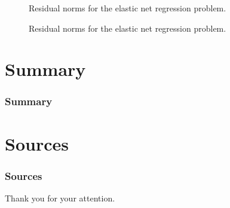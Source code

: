 \begin{frame}
	\begin{figure}
		\centering
		
		\caption{Residual norms for the elastic net regression problem.}
	\end{figure}
\end{frame}

\begin{frame}
	\begin{figure}
		\centering
		{\scriptsize
		
		}
		\caption{Residual norms for the elastic net regression problem.}
	\end{figure}
\end{frame}

\section{Summary}

\begin{frame}
	\frametitle{Summary}
\end{frame}

\section{Sources}

\begin{frame}[allowframebreaks]
	\frametitle{Sources}
	\nocite{*}
%	
%	
	\printbibliography
\end{frame}


\begin{frame}[plain]
	\begin{center}
		\Large{{Thank you for your attention.}}
	\end{center}
\end{frame}

\frame[plain]


